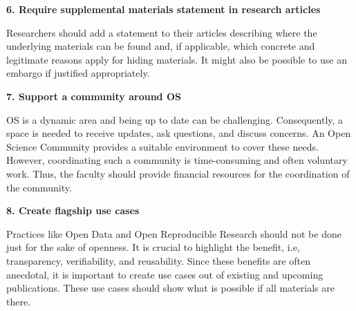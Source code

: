 \documentclass[gc, manuscript]{copernicus}
\begin{document}
\textbf{6. Require supplemental materials statement in research articles}

Researchers should add a statement to their articles describing where
the underlying materials can be found and, if applicable, which concrete
and legitimate reasons apply for hiding materials. It might also be
possible to use an embargo if justified appropriately.

\textbf{7. Support a community around OS}

OS is a dynamic area and being up to date can be challenging.
Consequently, a space is needed to receive updates, ask questions, and
discuss concerns. An Open Science Community provides a suitable
environment to cover these needs. However, coordinating such a community
is time-consuming and often voluntary work. Thus, the faculty should
provide financial resources for the coordination of the community.

\textbf{8. Create flagship use cases}

Practices like Open Data and Open Reproducible Research should not be
done just for the sake of openness. It is crucial to highlight the
benefit, i.e, transparency, verifiability, and reusability. Since these
benefits are often anecdotal, it is important to create use cases out of
existing and upcoming publications. These use cases should show what is
possible if all materials are there.













\end{document}
